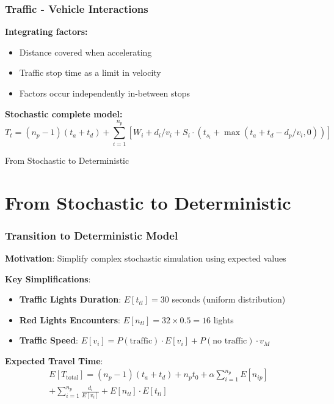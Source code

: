 \documentclass[12pt]{beamer}
\begin{document}
\begin{frame}
\frametitle{Traffic - Vehicle Interactions}


\textbf{Integrating factors:}

\begin{itemize}
    \item Distance covered when accelerating
    \item Traffic stop time as a limit in velocity
    \item Factors occur independently in-between stops
\end{itemize}
\vspace{0.5cm}
\textbf{Stochastic complete model:}
\begin{equation}
    T_t=(n_p-1)(t_a+t_d)+\sum_{i=1}^{n_p} [W_i + d_i/v_i +S_i\cdot (t_{s_i}+\max({t_a+t_d-d_{p}/v_i},0))]
\end{equation}

\end{frame}


\begin{frame}
\begin{center}
\Huge{From Stochastic to Deterministic}
\end{center}
\end{frame}

\section{From Stochastic to Deterministic}
\begin{frame}
\frametitle{Transition to Deterministic Model}
\textbf{Motivation}: Simplify complex stochastic simulation using expected values

\vspace{0.3cm}
\textbf{Key Simplifications}:
\begin{itemize}
\item \textbf{Traffic Lights Duration}: $E[t_{tl}] = 30$ seconds (uniform distribution)
\item \textbf{Red Lights Encounters}: $E[n_{tl}] = 32 \times 0.5 = 16$ lights
\item \textbf{Traffic Speed}: $E[v_i] = P(\text{traffic}) \cdot E[\hat{v}_i] + P(\text{no traffic}) \cdot v_M$
\end{itemize}

\vspace{0.3cm}
\textbf{Expected Travel Time}:
\begin{multline}
E[T_{\text{total}}] = (n_p-1)(t_a + t_d) + n_p t_0 + \alpha \sum_{i=1}^{n_p} E[n_{ip}] \\
+ \sum_{i=1}^{n_p} \frac{d_i}{E[v_i]} + E[n_{tl}] \cdot E[t_{tl}]
\end{multline}
\end{frame}
\end{document}

